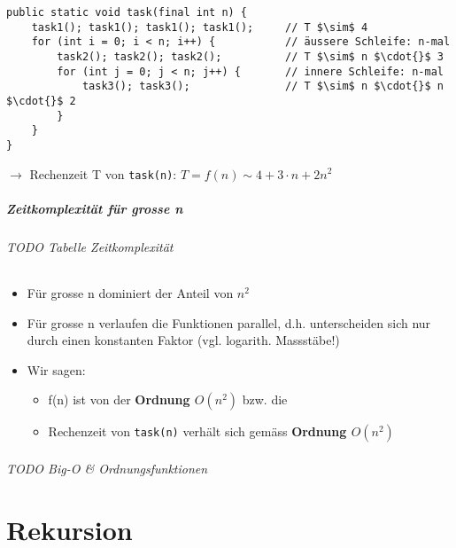 \lstset{language=Java}
\begin{lstlisting}[mathescape]
public static void task(final int n) {
    task1(); task1(); task1(); task1();     // T $\sim$ 4
    for (int i = 0; i < n; i++) {           // äussere Schleife: n-mal
        task2(); task2(); task2();          // T $\sim$ n $\cdot{}$ 3
        for (int j = 0; j < n; j++) {       // innere Schleife: n-mal
            task3(); task3();               // T $\sim$ n $\cdot{}$ n $\cdot{}$ 2
        }
    }
}
\end{lstlisting}
$\rightarrow$ Rechenzeit T von \texttt{task(n)}: $T=f(n)\sim 4+3\cdot n+2n^2$

\subsubsection{Zeitkomplexität für grosse n}
\paragraph{TODO Tabelle Zeitkomplexität}
\begin{itemize}[noitemsep,topsep=0pt,leftmargin=*]
    \item Für grosse n dominiert der Anteil von \textbf{$n^2$}
    \item Für grosse n verlaufen die Funktionen parallel, d.h. unterscheiden sich nur durch einen konstanten Faktor (vgl. logarith. Massstäbe!)
    \item Wir sagen:
    \begin{itemize}[noitemsep,topsep=0pt,leftmargin=*]
        \item f(n) ist von der \textbf{Ordnung $O(n^2)$} bzw. die
        \item Rechenzeit von \texttt{task(n)} verhält sich gemäss \textbf{Ordnung $O(n^2)$}
    \end{itemize}
\end{itemize}
\paragraph{TODO Big-O \& Ordnungsfunktionen}

\part{Rekursion}
